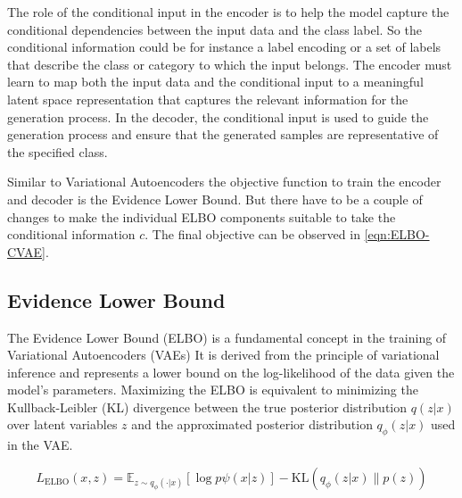 The role of the conditional input in the encoder is to help the model capture the conditional dependencies between the input data and the class label. So the conditional information could be for instance a label encoding or a set of labels that describe the class or category to which the input belongs. The encoder must learn to map both the input data and the conditional input to a meaningful latent space representation that captures the relevant information for the generation process. In the decoder, the conditional input is used to guide the generation process and ensure that the generated samples are representative of the specified class.

Similar to Variational Autoencoders the objective function to train the encoder and decoder is the Evidence Lower Bound. But there have to be a couple of changes to make the individual ELBO components suitable to take the conditional information $c$. The final objective can be observed in \eqref{eqn:ELBO-CVAE}. 


\subsection{Evidence Lower Bound}\label{sec:ELBO}

The Evidence Lower Bound (ELBO) is a fundamental concept in the training of Variational Autoencoders (VAEs)
It is derived from the principle of variational inference and represents a lower bound on the log-likelihood of the data given the model's parameters. Maximizing the ELBO is equivalent to minimizing the Kullback-Leibler (KL) divergence between the true posterior distribution $q(z|x)$ over latent variables $z$ and the approximated posterior distribution $q_\phi(z|x)$ used in the VAE.

\begin{equation}\label{eqn:ELBO}
	L_\text{ELBO}(x, z) = \mathbb{E}_{z\sim q_\phi(\cdot|x)} \left[ \log p\psi(x|z) \right] - \text{KL}\left( q_\phi(z|x) \| p(z) \right)
\end{equation}

